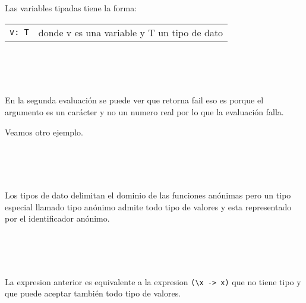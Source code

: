       Las variables tipadas tiene la forma:
      \begin{longtable}[c]{ll}
         \texttt{v: T}    & donde v es una variable y T un tipo de dato\\
      \end{longtable}
   
      \begin{fxcode}
         \\
         \\
         \\
      \end{fxcode}
      
      En la segunda evaluación se puede ver que retorna fail eso es porque el argumento es un carácter y no un numero real por lo que la evaluación falla.
      
      Veamos otro ejemplo.
      
      \begin{fxcode}
         \\
         \\
         \\
      \end{fxcode}
      
      Los tipos de dato delimitan el dominio de las funciones anónimas pero un tipo especial llamado tipo anónimo admite todo tipo de valores y esta representado por el identificador anónimo.
      
      \begin{fxcode}
         \\
         \\
         \\
      \end{fxcode}
      
      La expresion anterior es equivalente a la expresion \texttt{(\textbackslash x ->~x)} que no tiene tipo y que puede aceptar también todo tipo de valores.
      \\
      
